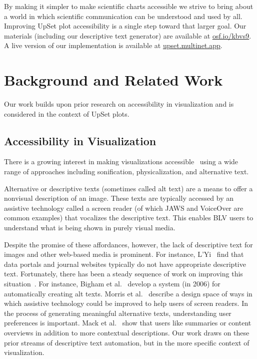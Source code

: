 \documentclass{egpubl}
\newcommand\asLink[2]{\textcolor{linkColor}{\href{#1}{\ul{#2}}}}
\newcommand{\etal}{et al.}
\newcommand{\osf}{\asLink{https://osf.io/kbvs9/?view_only=d8ab7284d60347af923d79c253305720}{osf.io/kbvs9}}
\begin{document}
By making it simpler to make scientific charts accessible we strive to bring about a world in which scientific communication can be understood and used by all.
Improving UpSet plot accessibility is a single step toward that larger goal.
Our materials (including our descriptive text generator) are available at \osf{}.
A live version of our implementation is available at \asLink{https://upset.multinet.app/}{upset.multinet.app}.

\section{Background and Related Work}


Our work builds upon prior research on accessibility in visualization and is considered in the context of UpSet plots.


\subsection{Accessibility in Visualization}

There is a growing interest in making visualizations accessible~\cite{kim_accessible_2021} using a wide range of approaches including sonification, physicalization, and alternative text.

Alternative or descriptive texts (sometimes called alt text) are a means to offer a nonvisual description of an image. These texts are typically accessed by an assistive technology called a screen reader (of which JAWS and VoiceOver are common examples) that vocalizes the descriptive text. This enables BLV users to understand what is being shown in purely visual media.

Despite the promise of these affordances, however, the lack of descriptive text for images and other web-based media is prominent.
For instance, L'Yi~\cite{lyi_digital_2024} find that data portals and journal websites typically do not have appropriate descriptive text.
Fortunately, there has been a steady sequence of work on improving this situation~\cite{wu_automatic_2017, gleason_twitter_2020, choi_visualizing_2019}.
For instance, Bigham \etal{}~\cite{bigham_webinsight_2006} develop a system (in 2006)  for automatically creating alt texts.
Morris \etal{}~\cite{morris_rich_2018} describe a design space of ways in which assistive technology could be improved to help users of screen readers.
In the process of generating meaningful alternative texts, understanding user preferences is important. Mack \etal{}~\cite{mack_designing_2021} show that users like summaries or content overviews in addition to more contextual descriptions.
Our work draws on these prior streams of descriptive text automation, but in the more specific context of visualization.
\end{document}
